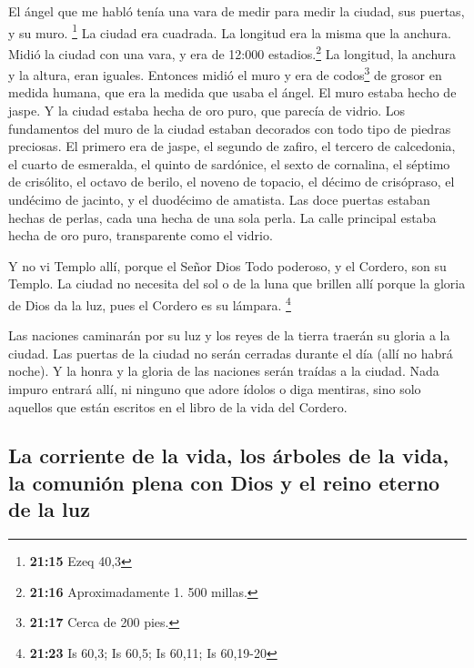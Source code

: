  El ángel que me habló tenía una vara de medir para medir
la ciudad, sus puertas, y su muro. \footnote{\textbf{21:15} Ezeq 40,3}
 La ciudad era cuadrada. La longitud era la misma que la
anchura. Midió la ciudad con una vara, y era de 12:000
estadios.\footnote{\textbf{21:16} Aproximadamente 1. 500 millas.} La
longitud, la anchura y la altura, eran iguales.  Entonces
midió el muro y era de codos\footnote{\textbf{21:17} Cerca de 200 pies.}
de grosor en medida humana, que era la medida que usaba el ángel.
 El muro estaba hecho de jaspe. Y la ciudad estaba hecha
de oro puro, que parecía de vidrio.  Los fundamentos del
muro de la ciudad estaban decorados con todo tipo de piedras preciosas.
El primero era de jaspe, el segundo de zafiro, el tercero de calcedonia,
el cuarto de esmeralda,  el quinto de sardónice, el sexto
de cornalina, el séptimo de crisólito, el octavo de berilo, el noveno de
topacio, el décimo de crisópraso, el undécimo de jacinto, y el duodécimo
de amatista.  Las doce puertas estaban hechas de perlas,
cada una hecha de una sola perla. La calle principal estaba hecha de oro
puro, transparente como el vidrio.

 Y no vi Templo allí, porque el Señor Dios Todo poderoso,
y el Cordero, son su Templo.  La ciudad no necesita del
sol o de la luna que brillen allí porque la gloria de Dios da la luz,
pues el Cordero es su lámpara. \footnote{\textbf{21:23} Is 60,3; Is
  60,5; Is 60,11; Is 60,19-20}

 Las naciones caminarán por su luz y los reyes de la
tierra traerán su gloria a la ciudad.  Las puertas de la
ciudad no serán cerradas durante el día (allí no habrá noche).
 Y la honra y la gloria de las naciones serán traídas a
la ciudad.  Nada impuro entrará allí, ni ninguno que
adore ídolos o diga mentiras, sino solo aquellos que están escritos en
el libro de la vida del Cordero.

\hypertarget{la-corriente-de-la-vida-los-uxe1rboles-de-la-vida-la-comuniuxf3n-plena-con-dios-y-el-reino-eterno-de-la-luz}{%
\subsection{La corriente de la vida, los árboles de la vida, la comunión
plena con Dios y el reino eterno de la
luz}\label{la-corriente-de-la-vida-los-uxe1rboles-de-la-vida-la-comuniuxf3n-plena-con-dios-y-el-reino-eterno-de-la-luz}}

